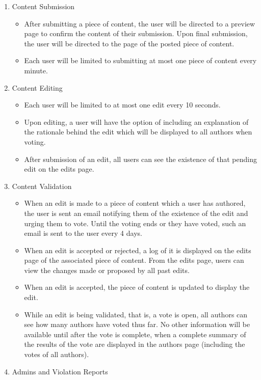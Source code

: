 \documentclass[12pt,letterpaper]{article}
\begin{document}
\begin{enumerate}
\begin{itemize}
\end{itemize}
\item[] Content Submission
\begin{itemize}
\item After submitting a piece of content, the user will be directed to a preview page to confirm the content of their submission. Upon final submission, the user will be directed to the page of the posted piece of content. 
\item Each user will be limited to submitting at most one piece of content every minute. 
\end{itemize}
\item[] Content Editing
\begin{itemize}
\item Each user will be limited to at most one edit every 10 seconds. 
\item Upon editing, a user will have the option of including an explanation of the rationale behind the edit which will be displayed to all authors when voting.
\item After submission of an edit, all users can see the existence of that pending edit on the edits page. 
\end{itemize}
\item[] Content Validation
\begin{itemize}
\item When an edit is made to a piece of content which a user has authored, the user is sent an email notifying them of the existence of the edit and urging them to vote. Until the voting ends or they have voted, such an email is sent to the user every 4 days. 
\item When an edit is accepted or rejected, a log of it is displayed on the edits page of the associated piece of content. From the edits page, users can view the changes made or proposed by all past edits.
\item When an edit is accepted, the piece of content is updated to display the edit. 
\item While an edit is being validated, that is, a vote is open, all authors can see how many authors have voted thus far. No other information will be available until after the vote is complete, when a complete summary of the results of the vote are displayed in the authors page (including the votes of all authors). 
\end{itemize}
\item[] Admins and Violation Reports
\begin{itemize}

\end{itemize}
\end{enumerate}
\end{document}

